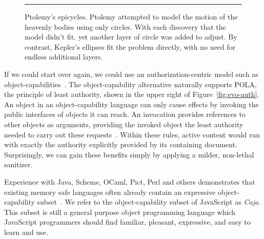 \documentclass[letterpaper,twocolumn,10pt]{article}
\begin{document}
\begin{figure}[t!]

  \caption[Ptolemy's epicycles.]{Ptolemy's epicycles. Ptolemy attempted to
  model the motion of the heavenly bodies using only circles. With each
  discovery that the model didn't fit, yet another layer of circle was added
  to adjust. By contrast, Kepler's ellipses fit the problem directly, with no
  need for endless additional layers. 
  \\ } \hrule
  \label{fig:epicycle}
\end{figure}

If we could start over again, we could use an authorization-centric model 
such as object-capabilities~\cite{DVH}. The object-capability alternative 
naturally supports POLA, the principle of least authority, shown in the upper 
right of Figure~\ref{fig:evo-auth}. An object in an object-capability 
language can only cause effects by invoking the public interfaces of objects 
it can reach. An invocation provides references to other objects as 
arguments, providing the invoked object the least authority needed to carry 
out these requests~\cite{RobustComposition}. Within these rules, active 
content would run with exactly the authority explicitly provided by its 
containing document. Surprisingly, we can gain these benefits simply by 
applying a milder, non-lethal sanitizer.

Experience with Java, Scheme, OCaml, Pict, Perl and others demonstrates that 
existing memory safe languages often already contain an expressive 
object-capability subset~\cite[respectively]{joe-e, rees96security, emily, 
backwater, caperl}. We refer to the object-capability subset of JavaScript as 
\emph{Caja}. This subset is still a general purpose object programming 
language which JavaScript programmers should find familiar, pleasant, 
expressive, and easy to learn and use. 
\end{document}
